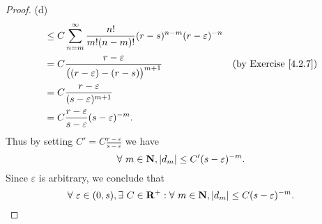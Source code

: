 \begin{proof}{(d)}
\begin{align*}
                                              & \leq C \sum_{n = m}^\infty \frac{n!}{m! (n - m)!} (r - s)^{n - m} (r - \varepsilon)^{-n}                                           \\
                                              & = C \frac{r - \varepsilon}{\big((r - \varepsilon) - (r - s)\big)^{m + 1}}                       & \text{(by Exercise \ref{4.2.7})} \\
                                              & = C \frac{r - \varepsilon}{(s - \varepsilon)^{m + 1}}                                                                              \\
                                              & = C \frac{r - \varepsilon}{s - \varepsilon} (s - \varepsilon)^{-m}.
    \end{align*}
    Thus by setting \(C' = C \frac{r - \varepsilon}{s - \varepsilon}\) we have
    \[
        \forall\ m \in \mathbf{N}, \abs*{d_m} \leq C' (s - \varepsilon)^{-m}.
    \]
    Since \(\varepsilon\) is arbitrary, we conclude that
    \[
        \forall\ \varepsilon \in (0, s), \exists\ C \in \mathbf{R}^+ : \forall\ m \in \mathbf{N}, \abs*{d_m} \leq C (s - \varepsilon)^{-m}.
    \]
\end{proof}

